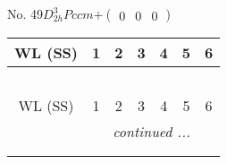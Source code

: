 \documentclass[fleqn,9pt,landscape]{jsarticle}
\begin{document}
\newpage
No. 49\quad$D_{2h}^{3}$\quad$Pccm$\quad[ orthorhombic ]\quad$+\begin{pmatrix} 0 & 0 & 0 \end{pmatrix}$
\begin{center}
\renewcommand{\arraystretch}{1.2}
\begin{longtable}{ccccccc}
 \hline \hline
WL (SS) & 1 & 2 & 3 & 4 & 5 & 6 \\ \hline \endfirsthead

\multicolumn{6}{l}{\tablename\ \thetable{}} \\
 \hline \hline
WL (SS) & 1 & 2 & 3 & 4 & 5 & 6 \\ \hline \endhead

 \hline \hline
\multicolumn{6}{r}{\footnotesize\it continued ...} \\ \endfoot

 \hline \hline
\multicolumn{6}{r}{} \\ \endlastfoot


\end{longtable}
\end{center}
\end{document}
